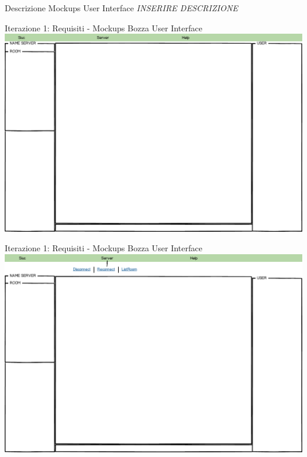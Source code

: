 \documentclass[t]{beamer} %
\begin{document}
\begin{frame}{Descrizione Mockups User Interface}
 \emph{INSERIRE DESCRIZIONE}
\end{frame} 

\begin{frame} {Iterazione 1: Requisiti - Mockups Bozza User Interface}
    \includegraphics[scale=0.29]{image_mockups/01_snuc_open.png}{\centering}
\end{frame}

\begin{frame} {Iterazione 1: Requisiti - Mockups Bozza User Interface}
    \includegraphics[scale=0.29]{image_mockups/02_snuc_menu_server.png}{\centering}
\end{frame}
\end{document}
